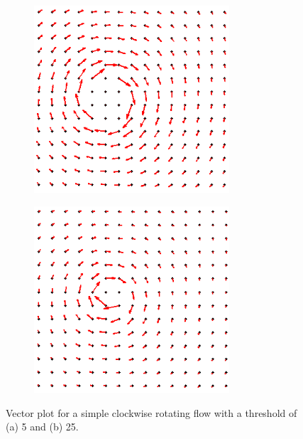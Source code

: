 \documentclass[letterpaper,12pt]{article}
\begin{document}
\begin{figure}[h]
    \centering
    \begin{subfigure}[b]{0.45\textwidth}
    	\centering
        \includegraphics[width=0.8\textwidth]{Vel_Vec_Thresh5.PNG}
        \caption{}
        \label{fig:Vel_Vec_Thresh5}
    \end{subfigure}
    \begin{subfigure}[b]{0.45\textwidth}
    	\centering
        \includegraphics[width=0.8\textwidth]{Vel_Vec_Thresh25.PNG}
        \caption{}
        \label{fig:Vel_Vec_Thresh25}
    \end{subfigure}
 	
    \caption{Vector plot for a simple clockwise rotating flow with a threshold of (a) 5 and (b) 25.}
    \label{fig:Vel_Vec}
\end{figure}
\end{document}
